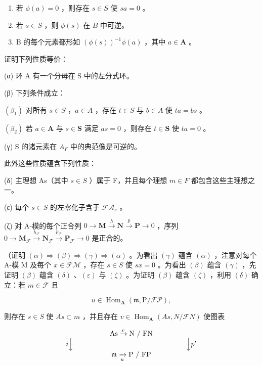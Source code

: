 \begin{enumerate}
\def\labelenumi{(\Roman{enumi})}
\item
  若 \(\phi(a) = 0\) ，则存在 \(s \in S\) 使 \(sa = 0\) 。
\item
  若 \(s \in S\) ，则 \(\phi(s)\) 在 \(B\) 中可逆。
\item
  B 的每个元素都形如 \((\phi(s))^{-1}\phi(a)\) ，其中 \(a \in \mathbf{A}\) 。
\end{enumerate}

证明下列性质等价：

(α) 环 A 有一个分母在 S 中的左分式环。

(β) 下列条件成立：

\((\beta_{1})\) 对所有 \(s \in S\) ，\(a \in A\) ，存在 \(t \in S\) 与 \(b \in A\) 使 \(ta = bs\) 。

\((\beta_{2})\) 若 \(a \in \mathbf{A}\) 与 \(s \in \mathbf{S}\) 满足 \(as = 0\) ，则存在 \(t \in \mathbf{S}\) 使 \(ta = 0\) 。

(γ) S 的诸元素在 \(A_{F}\) 中的典范像是可逆的。

此外这些性质蕴含下列性质：

(δ) 主理想 As（其中 \(s \in S\) ）属于 F，并且每个理想 \(m \in F\) 都包含这些主理想之一。

(ε) 每个 \(s \in S\) 的左零化子含于 \(\mathcal{FA}_{s}\) 。

(ζ) 对 A-模的每个正合列 \(0 \to \mathbf{M} \xrightarrow{h} \mathbf{N} \xrightarrow{p} \mathbf{P} \to 0\) ，序列 \(0 \longrightarrow \mathbf{M}_{\mathcal{F}} \xrightarrow{h_{\mathcal{F}}} \mathbf{N}_{\mathcal{F}} \xrightarrow{p_{\mathcal{F}}} \mathbf{P}_{\mathcal{F}} \longrightarrow 0\) 是正合的。

（证明 \((\alpha) \Rightarrow (\beta) \Rightarrow (\gamma) \Rightarrow (\alpha)\) 。为看出 \((\gamma)\) 蕴含 \((\alpha)\) ，注意对每个 A-模 M 及每个 \(x \in \mathcal{FM}\) ，存在 \(s \in S\) 使 \(sx = 0\) 。为看出 \((\beta)\) 蕴含 \((\gamma)\) ，先证明 \((\beta)\) 蕴含 \((\delta)\) 、\((\varepsilon)\) 与 \((\zeta)\) 。为证明 \((\beta)\) 蕴含 \((\zeta)\) ，利用 \((\delta)\) 确立：若 \(m \in \mathcal{F}\) 且

\[
u \in \operatorname{Hom} _ {\mathbf {A}} (\mathfrak {m}, \mathrm{P} / \mathscr {F P}),
\]

则存在 \(s \in S\) 使 \(As \subset m\) ，并且存在 \(v \in \operatorname{Hom}_{\mathbf{A}}(As, N/\mathcal{F}N)\) 使图表

\[
\begin{array}{c} \text {As} \xrightarrow {v} \text {N / FN} \\ i \Big \downarrow \qquad \qquad \qquad \qquad \qquad \qquad \qquad \qquad \Big \downarrow p ^ {\prime} \\ \mathfrak {m} \xrightarrow [ u ]{} \text {P / FP} \end{array}
\]

